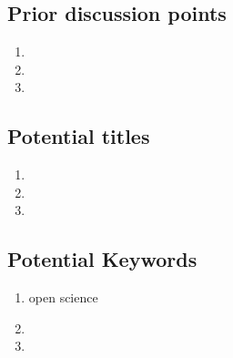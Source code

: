 \documentclass[10pt,letterpaper]{article}
\newcommand{\be}{\begin{enumerate}}
\newcommand{\ee}{\end{enumerate}}
\begin{document}
\subsection{Prior discussion points}
\label{subsec:priorDiscussion}


\begin{enumerate}
  \item 
  \item
  \item
\end{enumerate}



\subsection{Potential titles}
\label{sub:titles}



\begin{enumerate}
  \item 
  \item 
  \item
\end{enumerate}



\subsection*{Potential Keywords}
\label{sub:keywords}

\be
    \item open science
    \item 
    \item 
\ee
\end{document}
